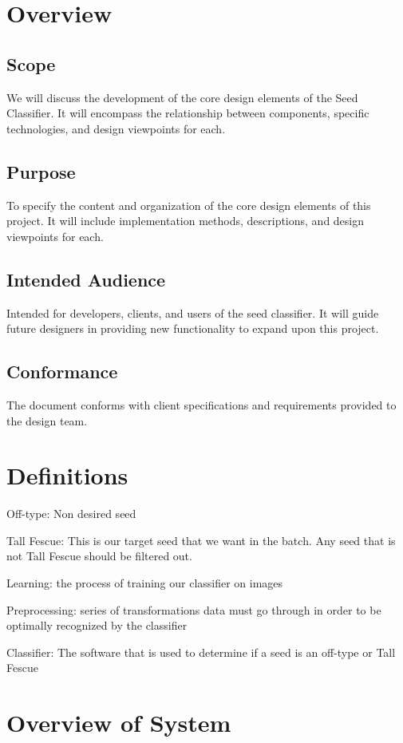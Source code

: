 \documentclass[onecolumn, draftclsnofoot,10pt, compsoc]{IEEEtran}
\begin{document}
\section{Overview}

\subsection{Scope}
We will discuss the development of the core design elements of the Seed Classifier. It will encompass the relationship between components, specific technologies, and design viewpoints for each.

\subsection{Purpose}
To specify the content and organization of the core design elements of this project. It will include implementation methods, descriptions, and design viewpoints for each. 

\subsection{Intended Audience}
Intended for developers, clients, and users of the seed classifier. It will guide future designers in providing new functionality to expand upon this project.

\subsection{Conformance}
The document conforms with client specifications and requirements provided to the design team.

\section{Definitions}

Off-type: Non desired seed

Tall Fescue: This is our target seed that we want in the batch. Any seed that is not Tall Fescue should be filtered out.

Learning: the process of training our classifier on images

Preprocessing: series of transformations data must go through in order to be optimally recognized by the classifier

Classifier: The software that is used to determine if a seed is an off-type or Tall Fescue


\section{Overview of System}
\end{document}
